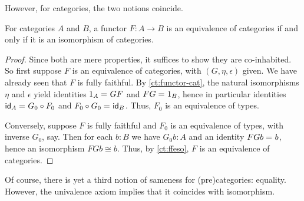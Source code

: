 However, for categories, the two notions coincide.

\begin{lem}\label{ct:eqv-levelwise}
  For categories $A$ and $B$, a functor $F:A\to B$ is an equivalence of categories if and only if it is an isomorphism of categories.
\end{lem}
\begin{proof}
  Since both are mere properties, it suffices to show they are co-inhabited.
  So first suppose $F$ is an equivalence of categories, with $(G,\eta,\epsilon)$ given.
  We have already seen that $F$ is fully faithful.
  By \autoref{ct:functor-cat}, the natural isomorphisms $\eta$ and $\epsilon$ yield identities $\id{1_A}{GF}$ and $\id{FG}{1_B}$, hence in particular identities $\id{\idfunc[A]}{G_0\circ F_0}$ and $\id{F_0\circ G_0}{\idfunc[B]}$.
Thus, $F_0$ is an equivalence of types.

  Conversely, suppose $F$ is fully faithful and $F_0$ is an equivalence of types, with inverse $G_0$, say.
  Then for each $b:B$ we have $G_0 b:A$ and an identity $\id{FGb}{b}$, hence an isomorphism $FGb\cong b$.
  Thus, by \autoref{ct:ffeso}, $F$ is an equivalence of categories.
\end{proof}

Of course, there is yet a third notion of sameness for (pre)categories: equality.
However, the univalence axiom implies that it coincides with isomorphism.

